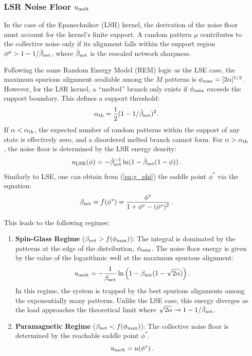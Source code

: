 \documentclass{article}
\theoremstyle{plain}
\theoremstyle{definition}
\theoremstyle{remark}
\begin{document}
\subsubsection{LSR Noise Floor $u_{\rm melt}$}

In the case of the Epanechnikov (LSR) kernel, the derivation of the noise floor must account for the kernel's finite support. A random pattern $\mu$ contributes to the collective noise only if its alignment falls within the support region $\phi^\mu > 1 - 1/\hat\beta_{\rm net}$, where $\hat\beta_{\rm net}$ is the rescaled network sharpness.

Following the same Random Energy Model (REM) logic as the LSE case, the maximum spurious alignment available among the $M$ patterns is $\phi_{\rm max} = [2\alpha]^{1/2}$. However, for the LSR kernel, a ``melted'' branch only exists if $\phi_{\rm max}$ exceeds the support boundary. This defines a support threshold:
\begin{equation}
    \alpha_{\rm th} = \frac{1}{2} (1 - 1/\hat\beta_{\rm net})^2 .
    \label{eq:alpha_th}
\end{equation}
If $\alpha < \alpha_{\rm th}$, the expected number of random patterns within the support of any state is effectively zero, and a disordered melted branch cannot form. For $\alpha > \alpha_{\rm th}$, the noise floor is determined by the LSR energy density:
\begin{equation}
    u_{\rm LSR}(\phi) = -\hat\beta_{\rm net}^{-1} \ln ( 1 - \hat\beta_{\rm net}(1 - \phi) )\,.
\end{equation}
Similarly to LSE, one can obtain from (\ref{eq:g_phi}) the saddle point $\phi^*$ via the equation:
\begin{equation}
    \beta_{\rm net} = f(\phi^*) = \frac{\phi^*}{1 + \phi^* - (\phi^*)^2}\,.
\end{equation}

This leads to the following regimes:
\begin{enumerate}
    \item \textbf{Spin-Glass Regime} ($\beta_{\rm net} > f(\phi_{\rm max})$): 
    The integral is dominated by the patterns at the edge of the distribution, $\phi_{\rm max}$. The noise floor energy is given by the value of the logarithmic well at the maximum spurious alignment:
    \begin{equation}
        u_{\rm melt} = -\frac{1}{\beta_{\rm net}} \ln \left( 1 - \beta_{\rm net} (1 - \sqrt{2\alpha}) \right).
    \end{equation}
    In this regime, the system is trapped by the best spurious alignments among the exponentially many patterns. Unlike the LSE case, this energy diverges as the load approaches the theoretical limit where $\sqrt{2\alpha} \to 1 - 1/\hat\beta_{\rm net}$.
    
    \item \textbf{Paramagnetic Regime} ($\beta_{\rm net} < f(\phi_{\rm max})$): 
    The collective noise floor is determined by the reachable saddle point $\phi^*$. 
    \begin{equation}
        u_{\rm melt} = u(\phi^*)\,.
    \end{equation}
    
\end{enumerate}
\end{document}
